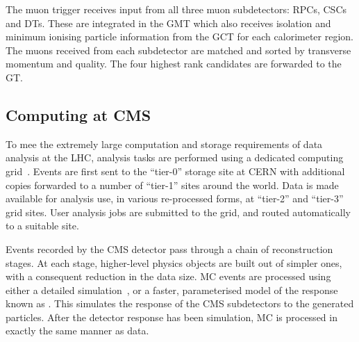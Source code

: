 The muon trigger receives input from all three muon subdetectors: \acp{RPC},
\acp{CSC} and \acp{DT}. These are integrated in the \ac{GMT} which also receives
isolation and minimum ionising particle information from the \ac{GCT} for each
calorimeter region. The muons received from each subdetector are matched and
sorted by transverse momentum and quality. The four highest rank candidates are
forwarded to the \ac{GT}.

\subsection{Computing at \ac{CMS}}
\label{sec:cms_computing}
To mee the extremely large computation and storage requirements of data analysis
at the \ac{LHC}, analysis tasks are performed using a dedicated computing
grid~\cite{lhc_grid}. Events are first sent to the ``tier-0'' storage site at
\ac{CERN} with additional copies forwarded to a number of ``tier-1'' sites
around the world. Data is made available for analysis use, in various
re-processed forms, at ``tier-2'' and ``tier-3'' grid sites. User analysis jobs
are submitted to the grid, and routed automatically to a suitable site.

Events recorded by the \ac{CMS} detector pass through a chain of reconstruction
stages. At each stage, higher-level physics objects are built out of simpler
ones, with a consequent reduction in the data size. \ac{MC} events are
processed using either a detailed \geantfour simulation~\cite{geant_paper}, or a
faster, parameterised model of the response known as \fastsim. This simulates
the response of the \ac{CMS} subdetectors to the generated particles. After the
detector response has been simulation, \ac{MC} is processed in exactly the
same manner as data.
